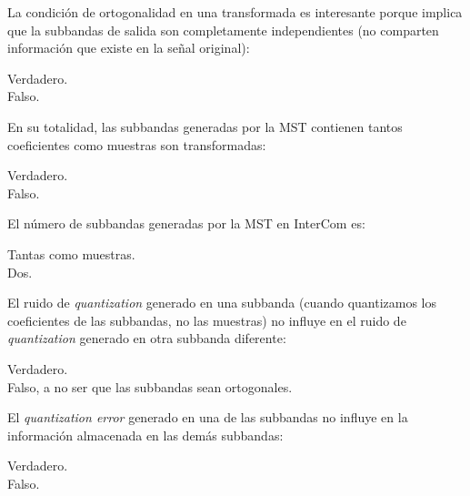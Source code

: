 \documentclass[legalpaper, 12pt, addpoints]{exam}
\begin{document}
\begin{questions}
\question La condición de ortogonalidad en una transformada es
interesante porque implica que la subbandas de salida son completamente
independientes (no comparten información que existe en la señal original):

\begin{oneparchoices}
  \choice Verdadero.\\
  \choice Falso.
\end{oneparchoices}
  
\vspace{0.10in}

\question En su totalidad, las subbandas generadas por la MST
contienen tantos coeficientes como muestras son transformadas:

\begin{oneparchoices}
  \choice Verdadero.\\
  \choice Falso.
\end{oneparchoices}
  
\vspace{0.10in}

\question El número de subbandas generadas por la MST en InterCom es:

\begin{oneparchoices}
  \choice Tantas como muestras.\\
  \choice Dos.
\end{oneparchoices}
  
\vspace{0.10in}

\question El ruido de \emph{quantization} generado en una subbanda
(cuando quantizamos los coeficientes de las subbandas, no las
muestras) no influye en el ruido de \emph{quantization} generado en
otra subbanda diferente:

\begin{oneparchoices}
  \choice Verdadero.\\
  \choice Falso, a no ser que las subbandas sean ortogonales.
\end{oneparchoices}
  
\vspace{0.10in}

\question El \emph{quantization error} generado en una de las
subbandas no influye en la información almacenada en las demás
subbandas:

\begin{oneparchoices}
  \choice Verdadero.\\
  \choice Falso.
\end{oneparchoices}
  

\end{questions}
\end{document}
